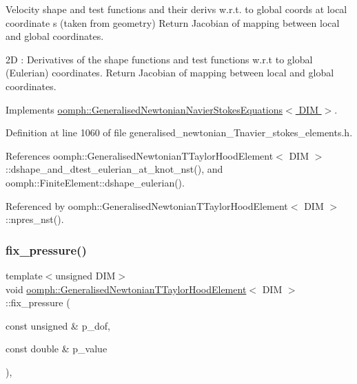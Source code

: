 Velocity shape and test functions and their derivs w.\+r.\+t. to global coords at local coordinate s (taken from geometry) Return Jacobian of mapping between local and global coordinates. 

2D \+: Derivatives of the shape functions and test functions w.\+r.\+t to global (Eulerian) coordinates. Return Jacobian of mapping between local and global coordinates. 

Implements \hyperlink{classoomph_1_1GeneralisedNewtonianNavierStokesEquations_a2607956e6619a4d3ef900bf65dd1ee8f}{oomph\+::\+Generalised\+Newtonian\+Navier\+Stokes\+Equations$<$ D\+I\+M $>$}.



Definition at line 1060 of file generalised\+\_\+newtonian\+\_\+\+Tnavier\+\_\+stokes\+\_\+elements.\+h.



References oomph\+::\+Generalised\+Newtonian\+T\+Taylor\+Hood\+Element$<$ D\+I\+M $>$\+::dshape\+\_\+and\+\_\+dtest\+\_\+eulerian\+\_\+at\+\_\+knot\+\_\+nst(), and oomph\+::\+Finite\+Element\+::dshape\+\_\+eulerian().



Referenced by oomph\+::\+Generalised\+Newtonian\+T\+Taylor\+Hood\+Element$<$ D\+I\+M $>$\+::npres\+\_\+nst().

\mbox{\label{classoomph_1_1GeneralisedNewtonianTTaylorHoodElement_a26ba51f8b7adebbd08e8969d622164d0}} 
\subsubsection{\texorpdfstring{fix\+\_\+pressure()}{fix\_pressure()}}
{\footnotesize\ttfamily template$<$unsigned D\+IM$>$ \\
void \hyperlink{classoomph_1_1GeneralisedNewtonianTTaylorHoodElement}{oomph\+::\+Generalised\+Newtonian\+T\+Taylor\+Hood\+Element}$<$ D\+IM $>$\+::fix\+\_\+pressure (\begin{DoxyParamCaption}\item[{const unsigned \&}]{p\+\_\+dof,  }\item[{const double \&}]{p\+\_\+value }\end{DoxyParamCaption})\hspace{0.3cm}{\ttfamily [inline]}, {\ttfamily [virtual]}}



